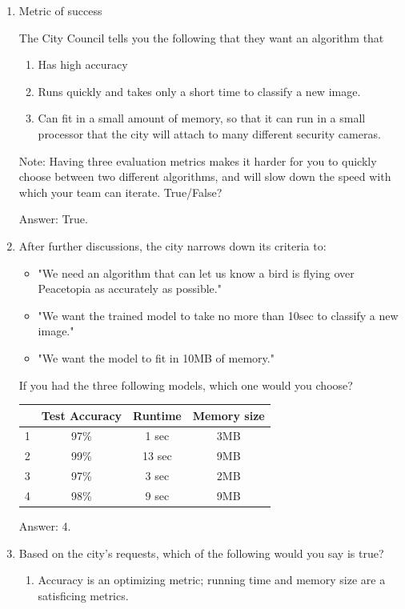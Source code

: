 \documentclass[12pt]{article}
\numberwithin{equation}{section}
\begin{document}
\begin{enumerate}
	\item Metric of success \par
	The City Council tells you the following that they want an algorithm that
	\begin{enumerate}
		\item Has high accuracy
		\item Runs quickly and takes only a short time to classify a new image.
		\item Can fit in a small amount of memory, so that it can run in a small processor that the city will attach to many different security cameras.
	\end{enumerate}
	Note: Having three evaluation metrics makes it harder for you to quickly choose between two different algorithms, and will slow down the speed with which your team can iterate. True/False? \par
	Answer: True.
	\item After further discussions, the city narrows down its criteria to: 
	\begin{itemize}
		\item "We need an algorithm that can let us know a bird is flying over Peacetopia as accurately as possible."
		\item "We want the trained model to take no more than 10sec to classify a new image."
		\item "We want the model to fit in 10MB of memory."
	\end{itemize}
	If you had the three following models, which one would you choose?
	\begin{table}[h!]
  		\centering
  		\begin{tabular}{c|c|c|c}
   			& Test Accuracy & Runtime & Memory size\\
   			\hline
    			1 & 97\% & 1 sec & 3MB\\
			2 & 99\% & 13 sec & 9MB\\
			3 & 97\% & 3 sec & 2MB\\
			4 & 98\% & 9 sec & 9MB\\
  		\end{tabular}
	\end{table} \par
	Answer: 4.
	\item Based on the city's requests, which of the following would you say is true?
		\begin{enumerate}
		\item Accuracy is an optimizing metric; running time and memory size are a satisficing metrics.

\end{enumerate}
\end{enumerate}
\end{document}
